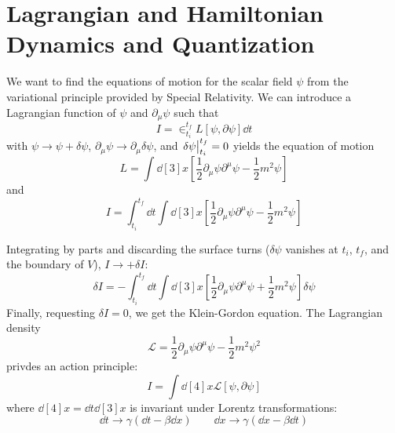 \documentclass[a4paper,twoside,master.tex]{subfiles}
\begin{document}
\section{Lagrangian and Hamiltonian Dynamics and Quantization}\label{sec:lagrangian_and_hamiltonian_dynamics_and_quantization}

We want to find the equations of motion for the scalar field $ \psi $ from the variational principle provided by Special Relativity. We can introduce a Lagrangian function of $ \psi $ and $ \partial_{\mu} \psi $ such that
\begin{equation}
    I = \in_{t_i}^{t_f} L[\psi, \partial \psi] \dd{t}
\end{equation}
with $ \psi \to \psi + \delta \psi $, $ \partial_{\mu} \psi \to \partial_{\mu} \delta \psi $, and $ \eval{\delta \psi}_{t_i}^{t_f} = 0 $ yields the equation of motion
\begin{equation}
    L = \int \dd[3]{x}\left[ \frac{1}{2} \partial_{\mu} \psi \partial^{\mu} \psi - \frac{1}{2} m^2 \psi \right]
\end{equation}
and
\begin{equation}
    I = \int_{t_i}^{t_f} \dd{t} \int \dd[3]{x}\left[ \frac{1}{2} \partial_{\mu} \psi \partial^{\mu} \psi - \frac{1}{2} m^2 \psi \right]
\end{equation}

Integrating by parts and discarding the surface turns ($ \delta \psi $ vanishes at $ t_i $, $ t_f $, and the boundary of $ V $), $ I \to + \delta I $:
\begin{equation}
    \delta I = -\int_{t_i}^{t_f} \dd{t} \int \dd[3]{x}\left[ \frac{1}{2} \partial_{\mu} \psi \partial^{\mu} \psi + \frac{1}{2} m^2 \psi \right] \delta \psi
\end{equation}
Finally, requesting $ \delta I = 0 $, we get the Klein-Gordon equation. The Lagrangian density
\begin{equation}
    \mathcal{L} = \frac{1}{2} \partial_{\mu} \psi \partial^{\mu} \psi - \frac{1}{2} m^2 \psi^2     
\end{equation}
privdes an action principle:
\begin{equation}
    I = \int \dd[4]{x} \mathcal{L}[\psi, \partial \psi]
\end{equation}
where $ \dd[4]{x} = \dd{t} \dd[3]{x} $ is invariant under Lorentz transformations:
\begin{equation}
    \dd{t} \to \gamma (\dd{t} - \beta \dd{x}) \qquad \dd{x} \to \gamma (\dd{x} - \beta \dd{t})
\end{equation}
\end{document}
